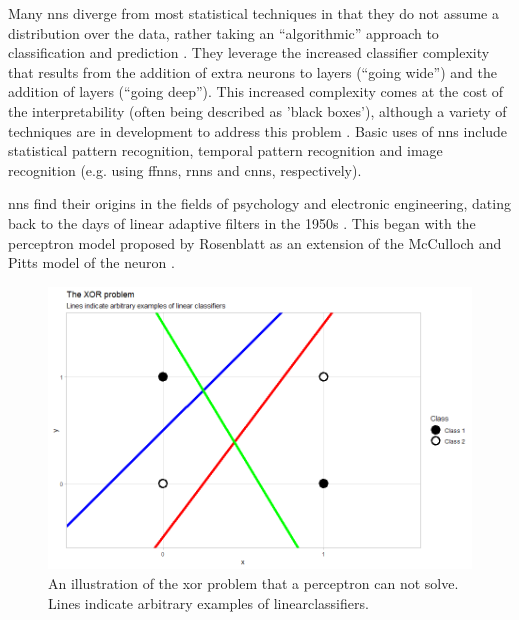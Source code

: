 \bigskip
Many \gls{nn}s diverge from most statistical techniques in that they do not assume a distribution over the data, rather taking an \enquote{algorithmic} approach to classification and prediction \cite{two_cultures}. They leverage the increased classifier complexity that results from the addition of extra neurons to layers (\enquote{going wide}) and the addition of \gls{layer}s (\enquote{going deep}). This increased complexity comes at the cost of the interpretability (often being described as 'black boxes'), although a variety of techniques are in development to address this problem \cite{nn_interpretability}. Basic uses of \gls{nn}s include statistical pattern recognition, temporal pattern recognition and image recognition (e.g. using \gls{ffnn}s, \gls{rnn}s and \gls{cnn}s, respectively).
\bigskip

\gls{nn}s find their origins in the fields of psychology and electronic engineering, dating back to the days of linear adaptive filters in the 1950s \cite{haykin}. This began with the perceptron model proposed by Rosenblatt \cite{perceptron_paper} as an extension of the McCulloch and Pitts model of the neuron \cite{logical_calculus}. 
\bigskip

\begin{figure}
    \centering
    \includegraphics[width=120mm]{figs/xor_problem.png}
    \caption[The \gls{xor} problem]{An illustration of the \gls{xor} problem that a perceptron can not solve. Lines indicate arbitrary examples of \gls{linearclassifier}s.}
    \label{fig:xor_problem}
\end{figure}

